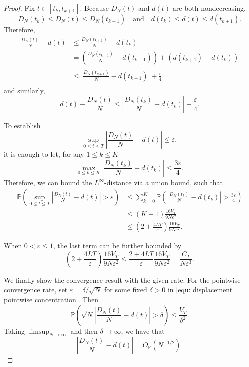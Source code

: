 \documentclass[10pt,a4paper]{amsart}
\newcommand{\pro}{\mathbb P}
\begin{document}
\begin{proof}
    Fix $t\in[t_k,t_{k+1}]$. Because $D_N(t)$ and  $d(t)$ are both nondecreasing,
    \begin{equation*}
        D_N(t_k)\leq D_N(t)\leq D_N(t_{k+1}) \quad \text{and} \quad d(t_k)\leq d(t)\leq d(t_{k+1}).
    \end{equation*}
    Therefore, 
    \begin{align*}
        \frac{D_N(t)}{N}-d(t)
        &\leq\frac{D_N(t_{k+1})}{N}-d(t_k) \\
        &=\left(\frac{D_N(t_{k+1})}{N}-d(t_{k+1})\right)+\left(d(t_{k+1})-d(t_k)\right) \\
        &\leq\left|\frac{D_N(t_{k+1})}{N}-d(t_{k+1})\right|+\frac{\varepsilon}{4}.
    \end{align*}
    and similarly,
    \[
    d(t)-\frac{D_N(t)}{N} \leq \left|\frac{D_N(t_{k})}{N}-d(t_{k})\right|+\frac{\varepsilon}{4}.
    \]

    To establish 
    \begin{equation*}
        \sup_{0\leq t\leq T}\left|\frac{D_N(t)}{N}-d(t)\right|\leq\varepsilon,
    \end{equation*}
    it is enough to let, for any $1\leq k\leq K$ 
    \begin{equation*}
        \max_{0\leq k\leq K}\left|\frac{D_N(t_k)}{N}-d(t_k)\right|\leq\frac{3\varepsilon}{4}.
    \end{equation*}
    Therefore, we can bound the $L^\infty$-distance via a union bound, such that
    \begin{align*}
        \pro\left(\sup_{0\leq t\leq T}\left|\frac{D_N(t)}{N}-d(t)\right|>\varepsilon\right)& \leq\sum_{k=0}^{K}\pro\left(\left|\frac{D_N(t_k)}{N}-d(t_k)\right|>\frac{3\varepsilon}{4}\right)\\
        & \leq (K+1) \frac{16V_T}{9N\varepsilon^2}\\
        & \leq (2+\frac{4 L T}{\varepsilon})\frac{16V_T}{9N\varepsilon^2}.
    \end{align*}

    When $0<\varepsilon\leq1$, the last term can be further bounded by  
    \begin{equation*}
        (2+\frac{4 L T}{\varepsilon})\frac{16V_T}{9N\varepsilon^2} \leq \frac{2+4 L T}{\varepsilon}\frac{16V_T}{9N\varepsilon^2} = \frac{C_T}{N\varepsilon^3}.
    \end{equation*}  


    We finally show the convergence result with the given rate. For the pointwise convergence rate, set $\varepsilon = \delta/\sqrt N$ for some fixed $\delta>0$ in \eqref{equ: displacement pointwise concentration}. Then
    \begin{equation*}
        \pro\left(\sqrt N\left|\frac{D_N(t)}{N}-d(t)\right|>\delta \right)\leq\frac{V_T}{\delta^2}.
    \end{equation*}
    Taking $\limsup_{N\to\infty}$ and then $\delta\to\infty$, we have that
    \begin{equation*}
        \left|\frac{D_N(t)}{N}-d(t)\right|=O_{\mathbb P}(N^{-1/2}).
    \end{equation*}
    

\end{proof}
\end{document}
